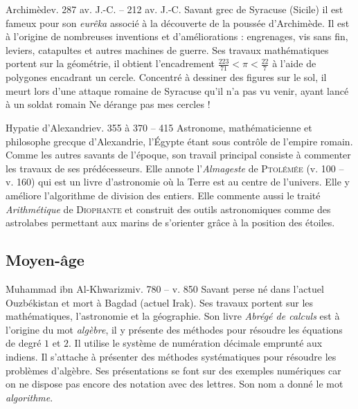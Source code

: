 \documentclass[10pt,class=article,crop=false]{standalone}
\begin{document}
\begin{multicols}{2}
\begin{biographie}{Archimède}{v. 287 av. J.-C. -- 212 av. J.-C.}
Savant grec de Syracuse (Sicile) il est fameux pour son \emph{eurêka} associé à la découverte de la poussée d'Archimède. Il est à l'origine de nombreuses inventions et d'améliorations : engrenages, vis sans fin, leviers, catapultes et autres machines de guerre.
Ses travaux mathématiques portent sur la géométrie, il obtient l'encadrement $\frac{223}{71} < \pi < \frac{22}{7}$ à l'aide de polygones encadrant un cercle.
Concentré à dessiner des figures sur le sol, il meurt lors d'une attaque romaine de Syracuse qu'il n'a pas vu venir, ayant lancé à un soldat romain \og{}Ne dérange pas mes cercles !\fg{}
\end{biographie}


\begin{biographie}{Hypatie d'Alexandrie}{v. 355 à 370 -- 415}
Astronome, mathématicienne et philosophe grecque d'Alexandrie, l'Égypte étant sous contrôle de l'empire romain. Comme les autres savants de l'époque, son travail principal consiste à commenter les travaux de ses prédécesseurs. Elle annote l'\emph{Almageste} de \textsc{Ptolémée} (v. 100 -- v. 160) qui est un livre d'astronomie où la Terre est au centre de l'univers. Elle y améliore l'algorithme de division des entiers. Elle commente aussi le traité \emph{Arithmétique} de \textsc{Diophante} et construit des outils astronomiques comme des astrolabes permettant aux marins de s'orienter grâce à la position des étoiles.
\end{biographie}


\subsection{Moyen-âge}

\begin{biographie}{Muhammad ibn Al-Khwarizmi}{v. 780 -- v. 850}
Savant perse né dans l'actuel Ouzbékistan et mort à Bagdad (actuel Irak).	Ses travaux portent sur les mathématiques, l'astronomie et la géographie.
Son livre \emph{Abrégé de calculs} est à l'origine du mot \emph{algèbre}, il y présente des méthodes  pour résoudre les équations de degré $1$ et $2$. Il utilise le système de numération décimale emprunté aux indiens. Il s'attache à présenter des méthodes systématiques pour résoudre les problèmes d'algèbre. 
Ses présentations se font sur des exemples numériques car on ne dispose pas encore des notation avec des lettres. Son nom a donné le mot \emph{algorithme}.
\end{biographie}



\end{multicols}
\end{document}
